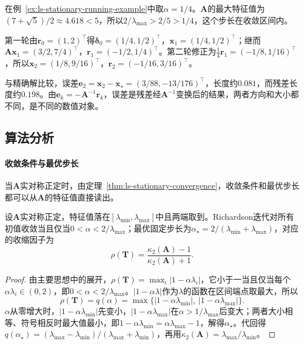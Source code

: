 \begin{example}[Richardson迭代的前两轮]
\label{ex:ls-richardson-two-sweeps}
在例~\ref{ex:ls-stationary-running-example}中取$\alpha=1/4$。$\bm A$的最大特征值为$(7+\sqrt5)/2\approx4.618<5$，所以$2/\lambda_{\max}>2/5>1/4$，这个步长在收敛区间内。

第一轮由$\bm r_0=(1,2)^\top$得$\bm\delta_0=(1/4,1/2)^\top$，$\bm x_1=(1/4,1/2)^\top$；继而$\bm A\bm x_1=(3/2,7/4)^\top$，$\bm r_1=(-1/2,1/4)^\top$。第二轮修正为$\tfrac14\bm r_1=(-1/8,1/16)^\top$，所以$\bm x_2=(1/8,9/16)^\top$，$\bm r_2=(-1/16,3/16)^\top$。

与精确解比较，误差$\bm e_2=\bm x_2-\bm x_\star=(3/88,-13/176)^\top$，长度约$0.081$，而残差长度约$0.198$。由$\bm e_k=-\bm A^{-1}\bm r_k$，误差是残差经$\bm A^{-1}$变换后的结果，两者方向和大小都不同，是不同的数值对象。
\end{example}

\subsection{算法分析}

\paragraph{收敛条件与最优步长}
当$\bm A$实对称正定时，由定理~\ref{thm:ls-stationary-convergence}，收敛条件和最优步长都可以从$\bm A$的特征值直接读出。
\begin{theorem}[对称正定矩阵的Richardson迭代]
\label{thm:ls-richardson-spd}
设$\bm A$实对称正定，特征值落在$[\lambda_{\min},\lambda_{\max}]$中且两端取到。Richardson迭代对所有初值收敛当且仅当$0<\alpha<2/\lambda_{\max}$；最优固定步长为$\alpha_\star=2/(\lambda_{\min}+\lambda_{\max})$，对应的收缩因子为
\[
\rho(\bm T)=\frac{\kappa_2(\bm A)-1}{\kappa_2(\bm A)+1}.
\]
\end{theorem}
\begin{proof}
由主要思想中的展开，$\rho(\bm T)=\max_i|1-\alpha\lambda_i|$，它小于一当且仅当每个$\alpha\lambda_i\in(0,2)$，即$0<\alpha<2/\lambda_{\max}$。$|1-\alpha\lambda|$作为$\lambda$的函数在区间端点取最大，所以
\[
\rho(\bm T)=q(\alpha)=\max\{|1-\alpha\lambda_{\min}|,\ |1-\alpha\lambda_{\max}|\}.
\]
$\alpha$从零增大时，$|1-\alpha\lambda_{\min}|$先变小，$|1-\alpha\lambda_{\max}|$在$\alpha>1/\lambda_{\max}$后变大；两者大小相等、符号相反时最大值最小，即$1-\alpha\lambda_{\min}=\alpha\lambda_{\max}-1$，解得$\alpha_\star$。代回得$q(\alpha_\star)=(\lambda_{\max}-\lambda_{\min})/(\lambda_{\max}+\lambda_{\min})$，再用$\kappa_2(\bm A)=\lambda_{\max}/\lambda_{\min}$。
\end{proof}

